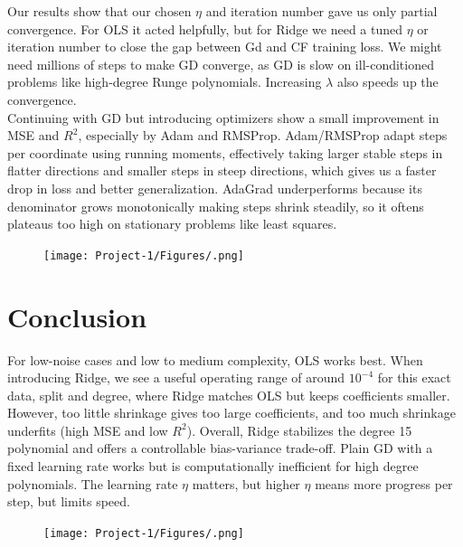 \documentclass[amssymb,twocolumn,aps]{revtex4-2}
\begin{document}
Our results show that our chosen $\eta$ and iteration number gave us only partial convergence. For OLS it acted helpfully, but for Ridge we need a tuned $\eta$ or iteration number to close the gap between Gd and CF training loss. We might need millions of steps to make GD converge, as GD is slow on ill-conditioned problems like high-degree Runge polynomials. Increasing $\lambda$ also speeds up the convergence. \\

Continuing with GD but introducing optimizers show a small improvement in MSE and $R^2$, especially by Adam and RMSProp. Adam/RMSProp adapt steps per coordinate using running moments, effectively taking larger stable steps in flatter directions and smaller steps in steep directions, which gives us a faster drop in loss and better generalization. AdaGrad underperforms because its denominator grows monotonically making steps shrink steadily, so it oftens plateaus too high on stationary problems like least squares. 



\begin{figure}[H]
    \centering
    \texttt{[image: Project-1/Figures/.png]}
    \caption{}
    \label{fig:}
\end{figure}




\section{Conclusion}\label{section:conclusion} 

For low-noise cases and low to medium complexity, OLS works best. When introducing Ridge, we see a useful operating range of around $10^{-4}$ for this exact data, split and degree, where Ridge matches OLS but keeps coefficients smaller. However, too little shrinkage gives too large coefficients, and too much shrinkage underfits (high MSE and low $R^2$). Overall, Ridge stabilizes the degree 15 polynomial and offers a controllable bias-variance trade-off. Plain GD with a fixed learning rate works but is computationally inefficient for high degree polynomials. The learning rate $\eta$ matters, but higher $\eta$ means more progress per step, but limits speed. 

\begin{figure}[H]
    \centering
    \texttt{[image: Project-1/Figures/.png]}
    \caption{}
    \label{fig:}
\end{figure}


\end{document}
